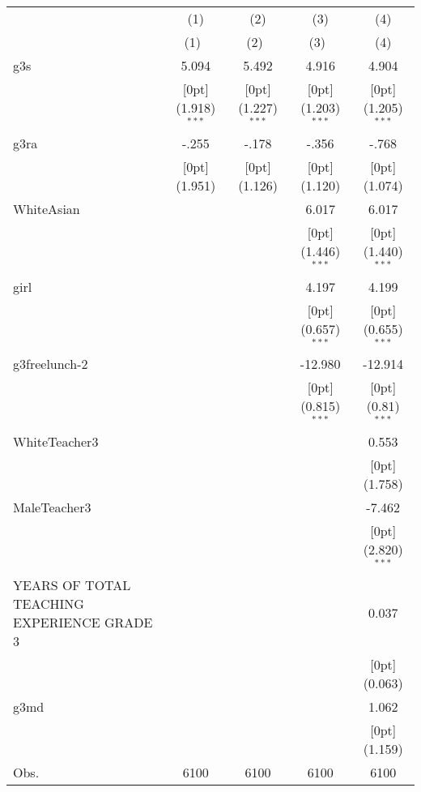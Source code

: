 \begin{tabular*}{\textwidth}{@{\extracolsep{\fill}}lcccc}				
	& \multicolumn{1}{c}{(1)} &	\multicolumn{1}{c}{(2)} &	\multicolumn{1}{c}{(3)} &	\multicolumn{1}{c}{(4)} \\
\cline{2-5}				
	& \multicolumn{1}{c}{(1)\mbox{\ }} &	\multicolumn{1}{c}{(2)\mbox{\ }} &	\multicolumn{1}{c}{(3)\mbox{\ }} &	\multicolumn{1}{c}{(4)} \\
\hline				
g3s &	5.094 &	5.492 &	4.916 &	4.904 \\
&	\raisebox{.7ex}[0pt]{\scriptsize (1.918)$^{***}$} &	\raisebox{.7ex}[0pt]{\scriptsize (1.227)$^{***}$} &	\raisebox{.7ex}[0pt]{\scriptsize (1.203)$^{***}$} &	\raisebox{.7ex}[0pt]{\scriptsize (1.205)$^{***}$} \\
g3ra &	-.255 &	-.178 &	-.356 &	-.768 \\
&	\raisebox{.7ex}[0pt]{\scriptsize (1.951)} &	\raisebox{.7ex}[0pt]{\scriptsize (1.126)} &	\raisebox{.7ex}[0pt]{\scriptsize (1.120)} &	\raisebox{.7ex}[0pt]{\scriptsize (1.074)} \\
WhiteAsian &	&	&	6.017 &	6.017 \\
&	&	&	\raisebox{.7ex}[0pt]{\scriptsize (1.446)$^{***}$} &	\raisebox{.7ex}[0pt]{\scriptsize (1.440)$^{***}$} \\
girl &	&	&	4.197 &	4.199 \\
&	&	&	\raisebox{.7ex}[0pt]{\scriptsize (0.657)$^{***}$} &	\raisebox{.7ex}[0pt]{\scriptsize (0.655)$^{***}$} \\
g3freelunch-2 &	&	&	-12.980 &	-12.914 \\
&	&	&	\raisebox{.7ex}[0pt]{\scriptsize (0.815)$^{***}$} &	\raisebox{.7ex}[0pt]{\scriptsize (0.81)$^{***}$} \\
WhiteTeacher3 &	&	&	&	0.553 \\
&	&	&	&	\raisebox{.7ex}[0pt]{\scriptsize (1.758)} \\
MaleTeacher3 &	&	&	&	-7.462 \\
&	&	&	&	\raisebox{.7ex}[0pt]{\scriptsize (2.820)$^{***}$} \\
YEARS OF TOTAL TEACHING EXPERIENCE GRADE 3 &	&	&	&	0.037 \\
&	&	&	&	\raisebox{.7ex}[0pt]{\scriptsize (0.063)} \\
g3md &	&	&	&	1.062 \\
&	&	&	&	\raisebox{.7ex}[0pt]{\scriptsize (1.159)} \\
Obs. &	6100 &	6100 &	6100 &	6100 \\
\hline\hline				
\end{tabular*}%
